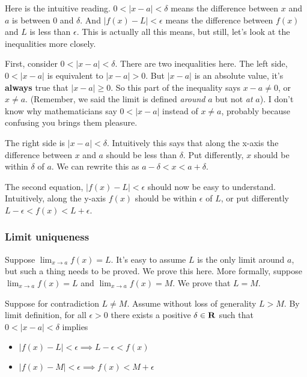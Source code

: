 \vs

Here is the intuitive reading. $0<|x-a|<\delta$ means the difference
between $x$ and $a$ is between $0$ and $\delta$. And
$|f(x)-L|<\epsilon$ means the difference between $f(x)$ and $L$ is less than
$\epsilon$. This is actually all this means, but still, let's look at the
inequalities more closely.

\vs

First, consider $0<|x-a|<\delta$. There are two inequalities here. The left
side, $0<|x-a|$ is equivalent to $|x-a|>0$. But $|x-a|$ is an absolute
value, it's \textbf{always} true that $|x-a|\geq 0$. So this part of the
inequality says $x-a\neq 0$, or $x\neq a$. (Remember, we said the limit is
defined \textit{around} $a$ but not \textit{at} $a$). I don't know why
mathematicians say $0<|x-a|$ instead of $x\neq a$, probably because
confusing you brings them pleasure.

\vs

The right side is $|x-a|<\delta$. Intuitively this says that along the
x-axis the difference between $x$ and $a$ should be less than
$\delta$. Put differently, $x$ should be within $\delta$ of $a$. We can rewrite
this as $a-\delta<x<a+\delta$.

\vs

The second equation, $|f(x)-L|<\epsilon$ should now be easy to understand.
Intuitively, along the y-axis $f(x)$ should be within $\epsilon$ of
$L$, or put differently $L-\epsilon<f(x)<L+\epsilon$.

\subsubsection*{Limit uniqueness}

Suppose $\lim_{x\to a}f(x)=L$. It's easy to assume $L$ is the only limit
around $a$, but such a thing needs to be proved. We prove this here.
More formally, suppose $\lim_{x\to a}f(x)=L$ and
$\lim_{x\to a}f(x)=M$. We prove that $L=M$.

\vs

Suppose for contradiction $L\neq M$. Assume without loss of generality
$L>M$. By limit definition, for all $\epsilon>0$ there exists a positive
$\delta\in\mathbf{R}$ such that $0<|x-a|<\delta$ implies

\begin{itemize}
\item $|f(x)-L|<\epsilon\implies L-\epsilon<f(x)$
\item $|f(x)-M|<\epsilon\implies f(x)<M+\epsilon$
\end{itemize}
    
